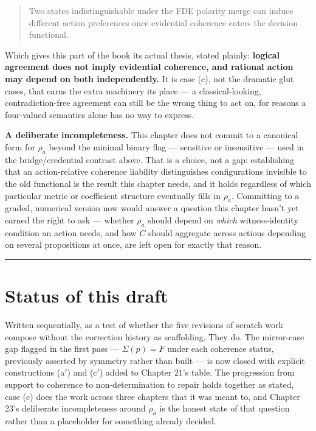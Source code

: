 \begin{quote}
Two states indistinguishable under the FDE polarity merge can induce
different action preferences once evidential coherence enters the
decision functional.
\end{quote}

Which gives this part of the book its actual thesis, stated plainly:
\textbf{logical agreement does not imply evidential coherence, and rational
action may depend on both independently.} It is case (c), not the
dramatic glut cases, that earns the extra machinery its place --- a
classical-looking, contradiction-free agreement can still be the wrong
thing to act on, for reasons a four-valued semantics alone has no way to
express.

\textbf{A deliberate incompleteness.} This chapter does not commit to a
canonical form for \(\rho_a\) beyond the minimal binary flag --- sensitive or
insensitive --- used in the bridge/credential contrast above. That is a
choice, not a gap: establishing that an action-relative coherence
liability distinguishes configurations invisible to the old functional is
the result this chapter needs, and it holds regardless of which
particular metric or coefficient structure eventually fills in \(\rho_a\).
Committing to a graded, numerical version now would answer a question
this chapter hasn't yet earned the right to ask --- whether \(\rho_a\) should
depend on \emph{which} witness-identity condition an action needs, and how \(C\)
should aggregate across actions depending on several propositions at
once, are left open for exactly that reason.

\begin{center}\rule{0.5\linewidth}{0.5pt}\end{center}

\hypertarget{status-of-this-draft}{%
\section{Status of this draft}\label{status-of-this-draft}}

Written sequentially, as a test of whether the five revisions of scratch
work compose without the correction history as scaffolding. They do. The
mirror-case gap flagged in the first pass --- \(\Sigma(p) = F\) under each
coherence status, previously asserted by symmetry rather than built --- is
now closed with explicit constructions (a\('\)) and (c\('\)) added to Chapter
21's table. The progression from support to coherence to non-determination
to repair holds together as stated, case (c) does the work across three
chapters that it was meant to, and Chapter 23's deliberate incompleteness
around \(\rho_a\) is the honest state of that question rather than a
placeholder for something already decided.
